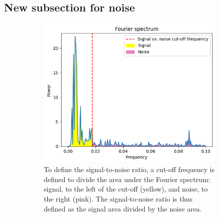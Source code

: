 

\subsection{New subsection for noise}
\label{subsec:analysis-characterisation-noise}

\begin{figure}
  \centering
  \begin{subfigure}[htpb]{0.5\textwidth}
   \centering
   \includegraphics[width=\textwidth]{snr_illustration}
   \caption{
     To define the signal-to-noise ratio, a cut-off frequency is defined to divide the area under the Fourier spectrum: signal, to the left of the cut-off (yellow), and noise, to the right (pink).
     The signal-to-noise ratio is thus defined as the signal area divided by the noise area.
   }
   \label{fig:analysis-snr-illustration}
 \end{subfigure}%
 \begin{subfigure}[htpb]{0.5\textwidth}
   \centering

\end{subfigure}
\end{figure}
